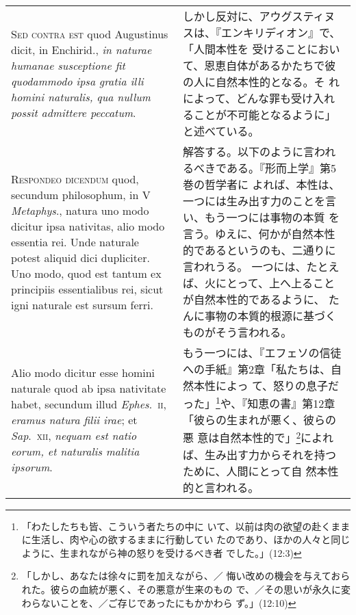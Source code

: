 \documentclass[10pt]{jsarticle} %
\begin{document}
\begin{longtable}{p{21em}p{21em}}
\\



{\scshape Sed contra est} quod Augustinus dicit, in Enchirid.,
{\itshape in naturae humanae susceptione fit quodammodo ipsa gratia
illi homini naturalis, qua nullum possit admittere peccatum}.



&

しかし反対に、アウグスティヌスは、『エンキリディオン』で、「人間本性を
受けることにおいて、恩恵自体があるかたちで彼の人に自然本性的となる。そ
れによって、どんな罪も受け入れることが不可能となるように」と述べている。


\\


{\scshape Respondeo dicendum} quod, secundum philosophum, in V
{\itshape Metaphys}., natura uno modo dicitur ipsa nativitas, alio
modo essentia rei. Unde naturale potest aliquid dici dupliciter. Uno
modo, quod est tantum ex principiis essentialibus rei, sicut igni
naturale est sursum ferri.


&


解答する。以下のように言われるべきである。『形而上学』第5巻の哲学者に
よれば、本性は、一つには生み出す力のことを言い、もう一つには事物の本質
を言う。ゆえに、何かが自然本性的であるというのも、二通りに言われうる。
一つには、たとえば、火にとって、上へ上ることが自然本性的であるように、
たんに事物の本質的根源に基づくものがそう言われる。

\\

Alio modo dicitur esse homini naturale quod ab ipsa nativitate habet,
secundum illud {\itshape Ephes}.~{\scshape ii}, {\itshape eramus
natura filii irae}; et {\itshape Sap}.~{\scshape xii}, {\itshape
nequam est natio eorum, et naturalis malitia ipsorum}.


&

もう一つには、『エフェソの信徒への手紙』第2章「私たちは、自然本性によっ
て、怒りの息子だった」\footnote{「わたしたちも皆、こういう者たちの中に
いて、以前は肉の欲望の赴くままに生活し、肉や心の欲するままに行動してい
たのであり、ほかの人々と同じように、生まれながら神の怒りを受けるべき者
でした。」(12:3)}や、『知恵の書』第12章「彼らの生まれが悪く、彼らの悪
意は自然本性的で」\footnote{「しかし、あなたは徐々に罰を加えながら、／
悔い改めの機会を与えておられた。彼らの血統が悪く、その悪意が生来のもの
で、／その思いが永久に変わらないことを、／ご存じであったにもかかわら
ず。」(12:10)}によれば、生み出す力からそれを持つために、人間にとって自
然本性的と言われる。



\end{longtable}
\end{document}
